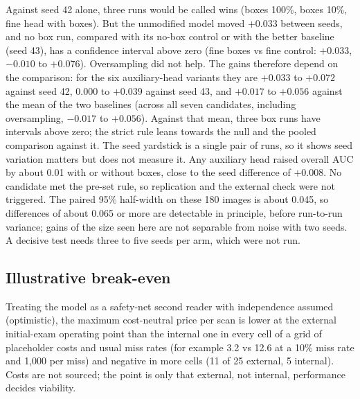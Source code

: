 \documentclass[11pt]{article}
\begin{document}
Against seed 42 alone, three runs would be called wins (boxes 100\%, boxes 10\%, fine head with boxes). But the unmodified model moved $+0.033$ between seeds, and no box run, compared with its no-box control or with the better baseline (seed 43), has a confidence interval above zero (fine boxes vs fine control: $+0.033$, $-0.010$ to $+0.076$). Oversampling did not help. The gains therefore depend on the comparison: for the six auxiliary-head variants they are $+0.033$ to $+0.072$ against seed 42, $0.000$ to $+0.039$ against seed 43, and $+0.017$ to $+0.056$ against the mean of the two baselines (across all seven candidates, including oversampling, $-0.017$ to $+0.056$). Against that mean, three box runs have intervals above zero; the strict rule leans towards the null and the pooled comparison against it. The seed yardstick is a single pair of runs, so it shows seed variation matters but does not measure it. Any auxiliary head raised overall AUC by about 0.01 with or without boxes, close to the seed difference of $+0.008$. No candidate met the pre-set rule, so replication and the external check were not triggered. The paired 95\% half-width on these 180 images is about 0.045, so differences of about 0.065 or more are detectable in principle, before run-to-run variance; gains of the size seen here are not separable from noise with two seeds. A decisive test needs three to five seeds per arm, which were not run.

\subsection{Illustrative break-even}
Treating the model as a safety-net second reader with independence assumed (optimistic), the maximum cost-neutral price per scan is lower at the external initial-exam operating point than the internal one in every cell of a grid of placeholder costs and usual miss rates (for example 3.2 vs 12.6 at a 10\% miss rate and 1,000 per miss) and negative in more cells (11 of 25 external, 5 internal). Costs are not sourced; the point is only that external, not internal, performance decides viability.
\end{document}
